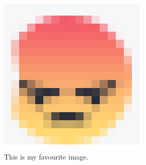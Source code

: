 \documentclass{article}
\begin{document}
        \begin{figure}[H]
            \centering
            \includegraphics[width=0.4\linewidth]{angery.png}
            \caption{This is my favourite image.}
            \label{fig:angery1}
        \end{figure}
\end{document}
